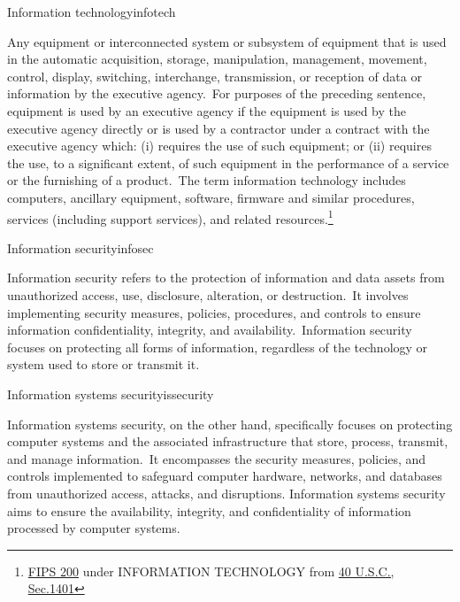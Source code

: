 \begin{center}
\begin{minipage}{\textwidth}
\renewcommand\thempfootnote{\textcolor{orange}{\arabic{footnote}}}
\setlength\parindent{15pt}
\begin{theo}{Information technology}{infotech}
\par Any equipment or interconnected system or subsystem of equipment that is used in the automatic acquisition, storage, manipulation, management, movement, control, display, switching, interchange, transmission, or reception of data or information by the executive agency.\ For purposes of the preceding sentence, equipment is used by an executive agency if the equipment is used by the executive agency directly or is used by a contractor under a contract with the executive agency which: (i) requires the use of such equipment; or (ii) requires the use, to a significant extent, of such equipment in the performance of a service or the furnishing of a product.\ The term information technology includes computers, ancillary equipment, software, firmware and similar procedures, services (including support services), and related resources.\cite{NIST2023}\footnote{\href{https://doi.org/10.6028/NIST.FIPS.200}{FIPS 200} under INFORMATION TECHNOLOGY from \href{https://www.govinfo.gov/app/details/USCODE-1998-title40/USCODE-1998-title40-chap25-sec1401}{40 U.S.C., Sec.\@1401}}
\end{theo}
\vspace{5pt}
\begin{theo}{Information security}{infosec}
\par Information security refers to the protection of information and data assets from unauthorized access, use, disclosure, alteration, or destruction.\ It involves implementing security measures, policies, procedures, and controls to ensure information confidentiality, integrity, and availability.\ Information security focuses on protecting all forms of information, regardless of the technology or system used to store or transmit it.\cite{boyle2023}
\end{theo}
\vspace{5pt}
\begin{theo}{Information systems security}{issecurity}
\par Information systems security, on the other hand, specifically focuses on protecting computer systems and the associated infrastructure that store, process, transmit, and manage information.\ It encompasses the security measures, policies, and controls implemented to safeguard computer hardware, networks, and databases from unauthorized access, attacks, and disruptions. Information systems security aims to ensure the availability, integrity, and confidentiality of information processed by computer systems.\cite{boyle2023}

\end{theo}
\end{minipage}
\end{center}
